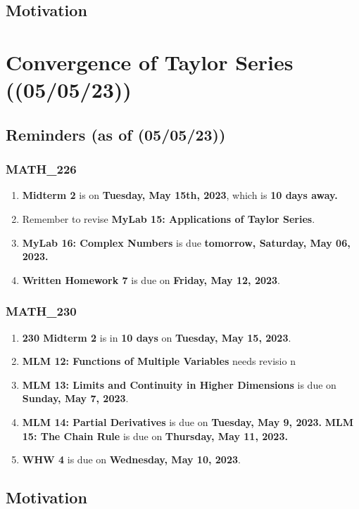\section{Motivation}

\chapter{Convergence of Taylor Series ((05/05/23))}
\section{Reminders (as of (05/05/23))}
\subsection{MATH\_226}
\begin{enumerate}
  \item  \textbf{Midterm 2} is on \textbf{Tuesday, May 15th, 2023}, which is \textbf{10 days away.}
  \item Remember to revise \textbf{MyLab 15:
        Applications of Taylor Series}.
  \item \textbf{MyLab 16: Complex Numbers} is
        due \textbf{tomorrow, Saturday, May 06, 2023.}
  \item \textbf{Written Homework 7} is due on
        \textbf{Friday, May 12, 2023}.
\end{enumerate}
\subsection{MATH\_230}
\begin{enumerate}
  \item \textbf{230 Midterm 2} is in \textbf{10 days} on
        \textbf{Tuesday, May 15, 2023}.
  \item \textbf{MLM 12: Functions of Multiple Variables} needs revisio n
  \item \textbf{MLM 13: Limits and Continuity in Higher
        Dimensions} is due on \textbf{Sunday, May 7, 2023}.
  \item \textbf{MLM 14: Partial Derivatives} is due on
        \textbf{Tuesday, May 9, 2023.}
        \textbf \textbf{MLM 15: The Chain Rule} is due on
        \textbf{Thursday, May 11, 2023.}
  \item \textbf{WHW 4} is due on \textbf{Wednesday,
        May 10, 2023}.

\end{enumerate}

\section{Motivation}

